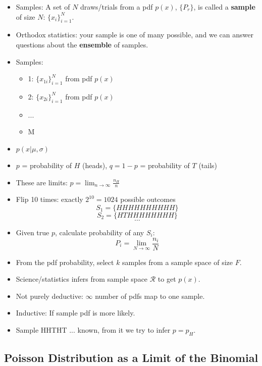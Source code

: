 \begin{itemize}
      \item Samples: A set of $N$ draws/trials from a pdf $p(x)$, $\{ P_r \}$, is called a \textbf{sample} of size $N$: $\{x_i \}_{i=1}^N$.
      \item Orthodox statistics: your sample is one of many possible, and we can answer questions about the \textbf{ensemble} of samples.
      \item Samples:
            \begin{itemize}
                  \item 1: $\{ x_{1i} \}_{i=1}^N$ from pdf $p(x)$
                  \item 2: $\{ x_{2i} \}_{i=1}^N$ from pdf $p(x)$
                  \item ...
                  \item M
            \end{itemize}
      \item $p(x|\mu, \sigma)$
      \item $p$ = probability of $H$ (heads), $q = 1 - p$ = probability of $T$ (tails)
      \item These are limits: $p = \lim_{n\rightarrow \infty} \frac{n_H}{n}$
      \item Flip 10 times: exactly $2^{10} = 1024$ possible outcomes
            \[ S_1 = \{ HHHHHHHHHH \} \]
            \[ S_2 = \{ HTHHHHHHHH \} \]
            \[ \ldots \]
      \item Given true $p$, calculate probability of any $S_i$:
            \[ P_i = \lim_{N\rightarrow \infty} \frac{n_i}{N} \]
      \item From the pdf probability, select $k$ samples from a sample space of size $F$.
      \item Science/statistics infers from sample space $\mathcal{R}$ to get $p(x)$.
      \item Not purely deductive: $\infty$ number of pdfs map to one sample.
      \item Inductive: If sample pdf is more likely.
      \item Sample HHTHT ... known, from it we try to infer $p = p_H$.
\end{itemize}

\subsection{Poisson Distribution as a Limit of the Binomial}

